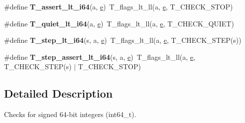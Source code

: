 \begin{DoxyCompactItemize}
\item 
\mbox{\label{group__RTEMSTestFrameworkChecksInt64_gabaca296cd159d21be25bb509f80ac872}} 
\#define {\bfseries T\+\_\+assert\+\_\+lt\+\_\+i64}(a,  \mbox{\hyperlink{sun4u_2tte_8h_a8b0b9ed08e0e18920ec2682f48228c27}{e}})~T\+\_\+flags\+\_\+lt\+\_\+ll(a, \mbox{\hyperlink{sun4u_2tte_8h_a8b0b9ed08e0e18920ec2682f48228c27}{e}}, T\+\_\+\+C\+H\+E\+C\+K\+\_\+\+S\+T\+OP)
\item 
\mbox{\label{group__RTEMSTestFrameworkChecksInt64_ga88178ff54cdb8993e9c2ab4f99ba3f08}} 
\#define {\bfseries T\+\_\+quiet\+\_\+lt\+\_\+i64}(a,  \mbox{\hyperlink{sun4u_2tte_8h_a8b0b9ed08e0e18920ec2682f48228c27}{e}})~T\+\_\+flags\+\_\+lt\+\_\+ll(a, \mbox{\hyperlink{sun4u_2tte_8h_a8b0b9ed08e0e18920ec2682f48228c27}{e}}, T\+\_\+\+C\+H\+E\+C\+K\+\_\+\+Q\+U\+I\+ET)
\item 
\mbox{\label{group__RTEMSTestFrameworkChecksInt64_ga6b6601fe8d2d1aa9a8fed977f8b2caa3}} 
\#define {\bfseries T\+\_\+step\+\_\+lt\+\_\+i64}(s,  a,  \mbox{\hyperlink{sun4u_2tte_8h_a8b0b9ed08e0e18920ec2682f48228c27}{e}})~T\+\_\+flags\+\_\+lt\+\_\+ll(a, \mbox{\hyperlink{sun4u_2tte_8h_a8b0b9ed08e0e18920ec2682f48228c27}{e}}, T\+\_\+\+C\+H\+E\+C\+K\+\_\+\+S\+T\+EP(s))
\item 
\mbox{\label{group__RTEMSTestFrameworkChecksInt64_gabc2ed056baa802c6daa9ca6728837cb9}} 
\#define {\bfseries T\+\_\+step\+\_\+assert\+\_\+lt\+\_\+i64}(s,  a,  \mbox{\hyperlink{sun4u_2tte_8h_a8b0b9ed08e0e18920ec2682f48228c27}{e}})~T\+\_\+flags\+\_\+lt\+\_\+ll(a, \mbox{\hyperlink{sun4u_2tte_8h_a8b0b9ed08e0e18920ec2682f48228c27}{e}}, T\+\_\+\+C\+H\+E\+C\+K\+\_\+\+S\+T\+EP(s) $\vert$ T\+\_\+\+C\+H\+E\+C\+K\+\_\+\+S\+T\+OP)
\end{DoxyCompactItemize}


\subsection{Detailed Description}
Checks for signed 64-\/bit integers (int64\+\_\+t). 


